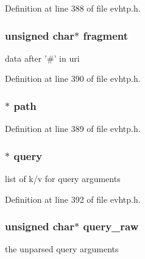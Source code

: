 Definition at line 388 of file evhtp.\-h.

\hypertarget{structevhtp__uri__s_a3c28c1d14341a7ab7ceb5600b7d353ae}{
\subsubsection[{fragment}]{\setlength{\rightskip}{0pt plus 5cm}unsigned char$\ast$ fragment}}\label{structevhtp__uri__s_a3c28c1d14341a7ab7ceb5600b7d353ae}
data after '\#' in uri 

Definition at line 390 of file evhtp.\-h.

\hypertarget{structevhtp__uri__s_af5dec3b872833197fa6e19e681e8a50b}{
\subsubsection[{path}]{$\ast$ path}}\label{structevhtp__uri__s_af5dec3b872833197fa6e19e681e8a50b}


Definition at line 389 of file evhtp.\-h.

\hypertarget{structevhtp__uri__s_ade25f426b13f051ad7fe2feacbcdf44e}{
\subsubsection[{query}]{$\ast$ query}}\label{structevhtp__uri__s_ade25f426b13f051ad7fe2feacbcdf44e}
list of k/v for query arguments 

Definition at line 392 of file evhtp.\-h.

\hypertarget{structevhtp__uri__s_ab78fb0297ee5380de7fe7087c2dada1b}{
\subsubsection[{query\-\_\-raw}]{\setlength{\rightskip}{0pt plus 5cm}unsigned char$\ast$ query\-\_\-raw}}\label{structevhtp__uri__s_ab78fb0297ee5380de7fe7087c2dada1b}
the unparsed query arguments 

